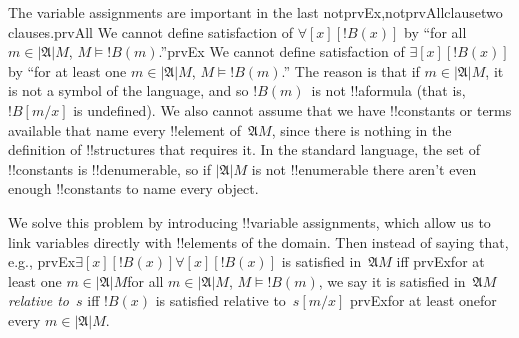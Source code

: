 \documentclass[10pt,a4paper]{article}
\theoremstyle{plain}
\theoremstyle{definition}
\theoremstyle{remark}
\newenvironment{explain}{}{}
\providecommand{\lforall}{\mathord{\forall}}
\providecommand{\lexists}{\mathord{\exists}}
\providecommand{\Subst}[3]{#1[#2/#3]}
\providecommand{\Struct}{\ensuremath{\mathfrak{A}}}
\providecommand{\Domain}{\ensuremath{|\mathfrak{A}|}}
\providecommand{\Sat}[2]{\ensuremath{#1 \models #2}}
\providecommand{\iftag}[1]{#1}
\providecommand{\iftag}{}
\begin{document}
\begin{explain}
The variable assignments are important in the last
\iftag{notprvEx,notprvAll}{clause}{two clauses}.\iftag{prvAll}{ We
cannot define satisfaction of $\lforall[x][!B(x)]$ by ``for all $m \in
\Domain{M}$, $\Sat{M}{!B(m)}$.''}{}\iftag{prvEx}{ We cannot define
satisfaction of $\lexists[x][!B(x)]$ by ``for at least one $m \in
\Domain{M}$, $\Sat{M}{!B(m)}$.''}{} The reason is that if $m \in
\Domain M$, it is not a symbol of the language, and so $!B(m)$~is not
!!a{formula} (that is, $\Subst{!B}{m}{x}$ is undefined).  We also
cannot assume that we have !!{constant}s or terms available that name
every !!{element} of~$\Struct{M}$, since there is nothing in the
definition of !!{structure}s that requires it.  In the standard
language, the set of !!{constant}s is !!{denumerable}, so if
$\Domain{M}$ is not !!{enumerable} there aren't even enough
!!{constant}s to name every object. 

We solve this problem by introducing !!{variable} assignments, which
allow us to link variables directly with !!{element}s of the domain.
Then instead of saying that, e.g.,
\iftag{prvEx}{$\lexists[x][!B(x)]$}{$\lforall[x][!B(x)]$} is satisfied
in~$\Struct M$ iff \iftag{prvEx}{for at least one $m \in
\Domain{M}$}{for all $m \in \Domain{M}$, $\Sat{M}{!B(m)}$}, we say it
is satisfied in~$\Struct M$ \emph{relative to}~$s$ iff $!B(x)$ is
satisfied relative to~$\Subst{s}{m}{x}$ \iftag{prvEx}{for at least
one}{for every} $m \in \Domain M$.
\end{explain}
\end{document}
